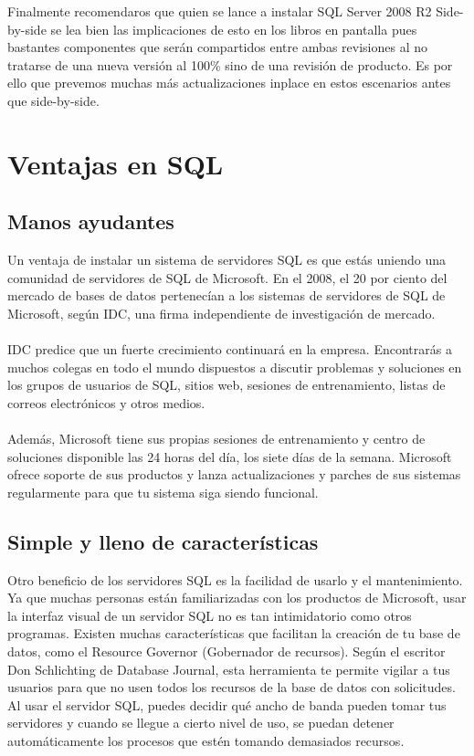 \documentclass[preprint,12pt]{elsarticle}
\begin{document}
Finalmente recomendaros que quien se lance a instalar SQL Server 2008 R2 Side-by-side se lea bien las implicaciones de esto en los libros en pantalla pues bastantes componentes que serán compartidos entre ambas revisiones al no tratarse de una nueva versión al 100\% sino de una revisión de producto. Es por ello que prevemos muchas más actualizaciones inplace en estos escenarios antes que side-by-side.
\\


\section{Ventajas en SQL}

\subsection{Manos ayudantes}	
Un ventaja de instalar un sistema de servidores SQL es que estás uniendo una comunidad de servidores de SQL de Microsoft. En el 2008, el 20 por ciento del mercado de bases de datos pertenecían a los sistemas de servidores de SQL de Microsoft, según IDC, una firma independiente de investigación de mercado.
\\
\\
 IDC predice que un fuerte crecimiento continuará en la empresa. Encontrarás a muchos colegas en todo el mundo dispuestos a discutir problemas y soluciones en los grupos de usuarios de SQL, sitios web, sesiones de entrenamiento, listas de correos electrónicos y otros medios. 
\\
\\
Además, Microsoft tiene sus propias sesiones de entrenamiento y centro de soluciones disponible las 24 horas del día, los siete días de la semana. Microsoft ofrece soporte de sus productos y lanza actualizaciones y parches de sus sistemas regularmente para que tu sistema siga siendo funcional.\cite{DLake01}
\\

\subsection{Simple y lleno de características}	
Otro beneficio de los servidores SQL es la facilidad de usarlo y el mantenimiento. Ya que muchas personas están familiarizadas con los productos de Microsoft, usar la interfaz visual de un servidor SQL no es tan intimidatorio como otros programas. Existen muchas características que facilitan la creación de tu base de datos, como el Resource Governor (Gobernador de recursos). Según el escritor Don Schlichting de Database Journal, esta herramienta te permite vigilar a tus usuarios para que no usen todos los recursos de la base de datos con solicitudes. Al usar el servidor SQL, puedes decidir qué ancho de banda pueden tomar tus servidores y cuando se llegue a cierto nivel de uso, se puedan detener automáticamente los procesos que estén tomando demasiados recursos.\cite{DLake01}
\\
\end{document}
